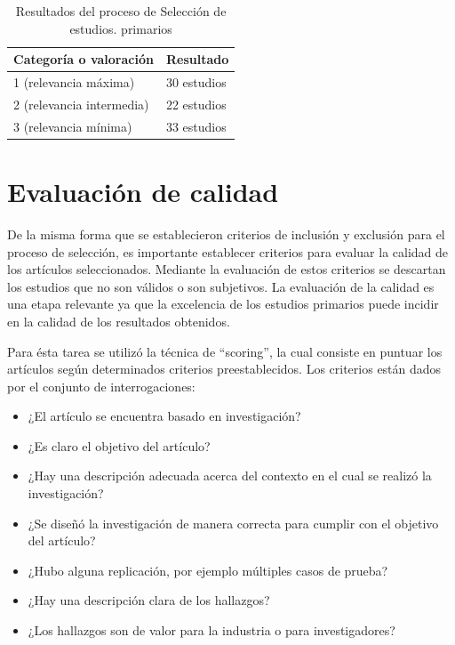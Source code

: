 \begin{table}[H] 
\caption{Resultados del proceso de Selección de estudios. primarios}
\centering
\begin{tabular}{| p{6cm} | p{4cm} |}
\hline
\textbf{Categoría o valoración} & \textbf{Resultado}\\ \hline
1 (relevancia máxima) & 30 estudios\\ \hline
2 (relevancia intermedia) & 22 estudios\\ \hline
3 (relevancia mínima) & 33 estudios \\ \hline
\end{tabular}
\label{tab:selection_results}
\end{table}

\section{Evaluación de calidad}

De la misma forma que se establecieron criterios de inclusión y exclusión para el proceso de selección, es importante establecer criterios para evaluar la calidad de los artículos seleccionados. Mediante la evaluación de estos criterios se descartan los estudios que no son válidos o son subjetivos. La evaluación de la calidad es una etapa relevante ya que la excelencia de los estudios primarios puede incidir en la calidad de los resultados obtenidos.

Para ésta tarea se utilizó la técnica de ``scoring'', la cual consiste en puntuar los artículos según determinados criterios preestablecidos. Los criterios están dados por el conjunto de interrogaciones:
\begin{itemize}
    \item ¿El artículo se encuentra basado en investigación?
    \item ¿Es claro el objetivo del artículo?
    \item ¿Hay una descripción adecuada acerca del contexto en el cual se realizó la investigación?
    \item ¿Se diseñó la investigación de manera correcta para cumplir con el objetivo del artículo?
    \item ¿Hubo alguna replicación, por ejemplo múltiples casos de prueba?
    \item ¿Hay una descripción clara de los hallazgos?
    \item ¿Los hallazgos son de valor para la industria o para investigadores?
\end{itemize}

